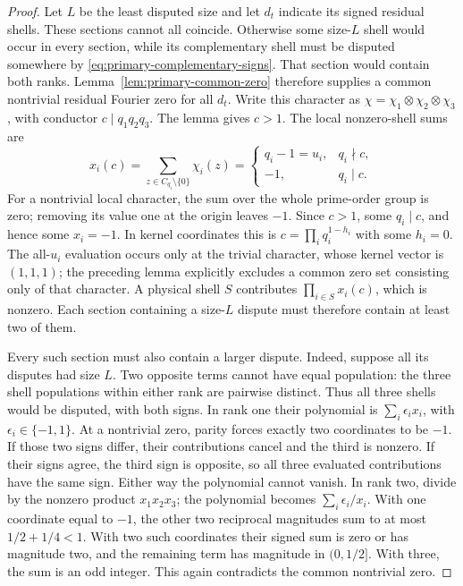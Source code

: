 \begin{proof}
Let \(L\) be the least disputed size and let \(d_t\) indicate its
signed residual shells. These sections cannot all coincide. Otherwise
some size-\(L\) shell would occur in every section, while its
complementary shell must be disputed somewhere by
\eqref{eq:primary-complementary-signs}. That section would contain
both ranks. Lemma~\ref{lem:primary-common-zero} therefore supplies a
common nontrivial residual Fourier zero for all \(d_t\).
Write this character as \(\chi=\chi_1\otimes\chi_2\otimes\chi_3\),
with conductor \(c\mid q_1q_2q_3\). The lemma gives \(c>1\).
The local nonzero-shell sums are
\[
 x_i(c)=\sum_{z\in C_{q_i}\setminus\{0\}}\chi_i(z)
 =\begin{cases}
 q_i-1=u_i,&q_i\nmid c,\\
 -1,&q_i\mid c.
 \end{cases}
\]
For a nontrivial local character, the sum over the whole prime-order
group is zero; removing its value one at the origin leaves \(-1\).
Since \(c>1\), some \(q_i\mid c\), and hence some \(x_i=-1\).
In kernel coordinates this is \(c=\prod_iq_i^{1-h_i}\) with some
\(h_i=0\). The all-\(u_i\) evaluation occurs only at the trivial
character, whose kernel vector is \((1,1,1)\); the preceding lemma
explicitly excludes a common zero set consisting only of that character.
A physical shell \(S\) contributes \(\prod_{i\in S}x_i(c)\), which
is nonzero. Each section containing a size-\(L\) dispute must therefore
contain at least two of them.

Every such section must also contain a larger dispute. Indeed, suppose
all its disputes had size \(L\). Two opposite terms cannot have equal
population: the three shell populations within either rank are
pairwise distinct. Thus all three shells would be disputed, with both
signs. In rank one their polynomial is
\(\sum_i\epsilon_ix_i\), with \(\epsilon_i\in\{-1,1\}\).
At a nontrivial zero, parity forces exactly two coordinates to be
\(-1\). If those two signs differ, their contributions cancel and
the third is nonzero. If their signs agree, the third sign is opposite,
so all three evaluated contributions have the same sign. Either way
the polynomial cannot vanish. In rank two, divide by the nonzero
product \(x_1x_2x_3\); the polynomial becomes
\(\sum_i\epsilon_i/x_i\). With one coordinate equal to \(-1\),
the other two reciprocal magnitudes sum to at most
\(1/2+1/4<1\). With two such coordinates their signed sum is zero
or has magnitude two, and the remaining term has magnitude in
\((0,1/2]\). With three, the sum is an odd integer. This again
contradicts the common nontrivial zero.


\end{proof}
